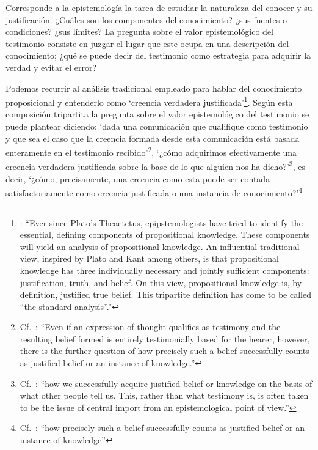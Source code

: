 Corresponde a la epistemología la tarea de estudiar la naturaleza del conocer y su justificación. ¿Cuáles son los componentes del conocimiento? ¿sus fuentes o condiciones? ¿sus límites? La pregunta sobre el valor epistemológico del testimonio consiste en juzgar el lugar que este ocupa en una descripción del conocimiento; ¿qué se puede decir del testimonio como estrategia para adquirir la verdad y evitar el error?

Podemos recurrir al análisis tradicional empleado para hablar del conocimiento proposicional y entenderlo como \enquote*{creencia verdadera justificada}\footnote{\cite[4]{moser2002ep}: \enquote{Ever since Plato's Theaetetus, epipstemologists have tried to identify the essential, defining components of propositional knowledge. These components will yield an analysis of propositional knowledge. An influential traditional view, inspired by Plato and Kant among others, is that propositional knowledge has three individually necessary and jointly sufficient components: justification, truth, and belief. On this view, propositional knowledge is, by definition, justified true belief. This tripartite definition has come to be called ``the standard analysis''.}}. Según esta composición tripartita la pregunta sobre el valor epistemológico del testimonio se puede plantear diciendo: \enquote*{dada una comunicación que cualifique como testimonio y que sea el caso que la creencia formada desde esta comunicación está basada enteramente en el testimonio recibido}\footnote{Cf.~\cite[4]{lackeysosa2006eptest}: \enquote{Even if an expression of thought qualifies as testimony and the resulting belief formed is entirely testimonially based for the hearer, however, there is the further question of how precisely such a belief successfully counts as justified belief or an instance of knowledge.}}, \enquote*{¿cómo adquirimos efectivamente una creencia verdadera justificada sobre la base de lo que alguien nos ha dicho?}\footnote{Cf.~\cite[2]{lackeysosa2006eptest}: \enquote{how we successfully acquire justified belief or knowledge on the basis of what other people tell us. This, rather than what testimony is, is often taken to be the issue of central import from an epistemological point of view.}}, es decir, \enquote*{¿cómo, precisamente, una creencia como esta puede ser contada satisfactoriamente como creencia justificada o una instancia de conocimiento?}\footnote{Cf.~\cite[4]{lackeysosa2006eptest}: \enquote{how precisely such a belief successfully counts as justified belief or an instance of knowledge}}

